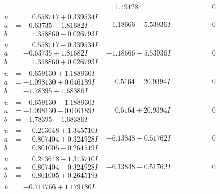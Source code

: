 \documentclass[1p]{elsarticle_modified}
\theoremstyle{definition}
\begin{document}
$$\begin{array}{c|c|c}
 & \phantom{-}1.49128\phantom{ +0.000000I} & \phantom{-0.000000 } 0 \\ \hline\begin{aligned}
u &= \phantom{-}0.558717 + 0.339534 I \\
a &= -0.63735 - 1.81682 I \\
b &= \phantom{-}1.358860 - 0.026793 I\end{aligned}
 & -1.18666 - 5.53936 I & \phantom{-0.000000 } 0 \\ \hline\begin{aligned}
u &= \phantom{-}0.558717 - 0.339534 I \\
a &= -0.63735 + 1.81682 I \\
b &= \phantom{-}1.358860 + 0.026793 I\end{aligned}
 & -1.18666 + 5.53936 I & \phantom{-0.000000 } 0 \\ \hline\begin{aligned}
u &= -0.659130 + 1.188930 I \\
a &= -1.098130 + 0.046189 I \\
b &= -1.78395 + 1.68386 I\end{aligned}
 & \phantom{-}0.5164 - 20.9394 I & \phantom{-0.000000 } 0 \\ \hline\begin{aligned}
u &= -0.659130 - 1.188930 I \\
a &= -1.098130 - 0.046189 I \\
b &= -1.78395 - 1.68386 I\end{aligned}
 & \phantom{-}0.5164 + 20.9394 I & \phantom{-0.000000 } 0 \\ \hline\begin{aligned}
u &= \phantom{-}0.213648 + 1.345710 I \\
a &= \phantom{-}0.807404 + 0.324928 I \\
b &= \phantom{-}0.801005 - 0.264519 I\end{aligned}
 & -6.13848 + 0.51762 I & \phantom{-0.000000 } 0 \\ \hline\begin{aligned}
u &= \phantom{-}0.213648 - 1.345710 I \\
a &= \phantom{-}0.807404 - 0.324928 I \\
b &= \phantom{-}0.801005 + 0.264519 I\end{aligned}
 & -6.13848 - 0.51762 I & \phantom{-0.000000 } 0 \\ \hline\begin{aligned}
u &= -0.714766 + 1.179180 I \\

\end{aligned}
\end{array}$$
\end{document}
